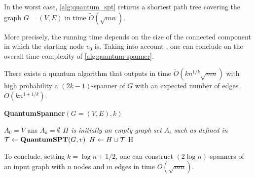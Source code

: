 


\begin{theorem}\label{thm:comp-spt}
In the worst case, \autoref{alg:quantum_spt} returns a shortest path tree covering the graph $G=(V,E)$ in time $\tilde{O}(\sqrt{mn})$.
\end{theorem}

More precisely, the running time depends on the size of the connected component in which the starting node $v_0$ is.
Taking into account , one can conclude on the overall time complexity of \autoref{alg:quantum-spanner}.

\begin{theorem}
There exists a quantum algorithm that outputs in time $\tilde{O}(k n^{1/k} \sqrt{mn})$ with high probability a $(2k-1)$-spanner of $G$ with an expected number of edges $O(k n^{1+1/k})$.
\label{th:q-spanner}
\end{theorem}

\begin{algorithm}[H]\label{alg:quantum-spanner}
\caption{\textbf{QuantumSpanner}$(G=(V,E), k)$}\label{alg:quantum-spanner}
\begin{algorithmic}[1]
    \Require $A_0 = V$ ans $A_k = \emptyset$
    \Ensure \textit{$H$ is initially an empty graph}
        \textit{set $A_i$ such as defined in }
    \EndIf
        \State $\mathcal T \leftarrow \mathbf{QuantumSPT}(G, v)$
        \State $H \leftarrow H \cup \mathcal T$
    \EndFor
    \EndFor
    \State \Return H
\end{algorithmic}
\end{algorithm}


To conclude, setting $k= \log n + 1/2 $, one can construct
$(2 \log n)$-spanners of an input graph with $n$ nodes and $m$ edges
in time $\tilde{O}(\sqrt{mn})$.
